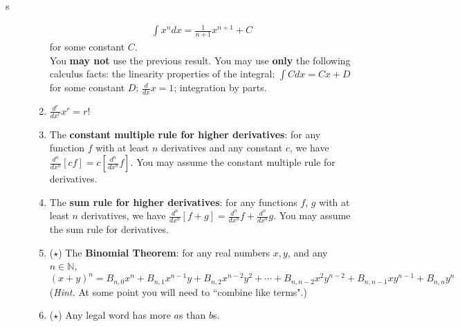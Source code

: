 s\documentclass[11pt]{letter}
\theoremstyle{definition}
\begin{document}
\begin{description}
\begin{enumerate}
				\begin{align*}
					\int x^ndx=\frac{1}{n+1}x^{n+1}+C
				\end{align*}
				for some constant $C$.\\
				You {\bfseries may not} use the previous result. You may use {\bfseries only} the following calculus facts: the linearity properties of the integral; $\int C dx=Cx+D$ for some constant $D$; $\frac{d}{dx} x=1$; integration by parts.
			\item $\frac{d^r}{dx^r}x^r=r!$
			\item The {\bfseries constant multiple rule for higher derivatives}: for any function $f$ with at least $n$ derivatives and any constant $c$, we have $\frac{d^n}{dx^n}\left[cf\right]=c\left[\frac{d^n}{dx^n}f\right]$. You may assume the constant multiple rule for derivatives.
			\item The {\bfseries sum rule for higher derivatives}: for any functions $f$, $g$ with at least $n$ derivatives, we have $\frac{d^n}{dx^n}\left[f+g\right]=\frac{d^n}{dx^n}f+\frac{d^n}{dx^n}g$. You may assume the sum rule for derivatives.
			\item ($\star$) The {\bfseries Binomial Theorem}: for any real numbers $x,y$, and any $n\in\mathbb{N}$,
				\begin{equation*}
					(x+y)^n=B_{n,0}x^n +B_{n,1}x^{n-1}y+B_{n,2}x^{n-2}y^2+\cdots+B_{n,n-2}x^2y^{n-2}+B_{n,n-1}x y^{n-1}+B_{n,n}y^n
				\end{equation*}
				({\em Hint.} At some point you will need to ``combine like terms".)
			\item ($\star$) Any legal word has more $a$s than $b$s.
			\end{enumerate}
\end{description}
\end{document}
